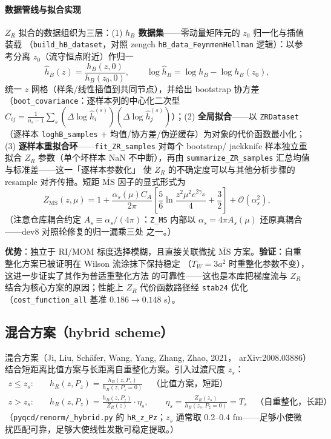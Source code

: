 \documentclass[11pt,a4paper]{ctexart}
\newcommand{\MSbarM}{\overline{\text{MS}}}
\newcommand{\order}[1]{\mathcal{O}(#1)}
\newcommand{\code}[1]{\texttt{#1}}
\begin{document}
\paragraph{数据管线与拟合实现}$Z_R$ 拟合的数据组织为三层：(1)
\textbf{$h_B$ 数据集}——零动量矩阵元的 $z_0$ 归一化与插值装载
（\code{build\_hB\_dataset}，对照 zengch \code{hB\_data\_FeynmenHellman}
逻辑）：以参考分离 $z_0$（流守恒点附近）作归一
\begin{equation}
\widehat h_B(z) = \frac{h_B(z,0)}{h_B(z_0,0)},
\qquad
\log \widehat h_B = \log h_B - \log h_B(z_0),
\end{equation}
统一 $z$ 网格（样条/线性插值到共同节点），并给出 bootstrap 协方差
（\code{boot\_covariance}：逐样本列的中心化二次型
$C_{ij}=\frac{1}{n_s-1}\sum_s(\Delta\log\widehat h_i^{(s)})
(\Delta\log\widehat h_j^{(s)})$）；(2)
\textbf{全局拟合}——以 \code{ZRDataset}（逐样本 \code{loghB\_samples}
+ 均值/协方差/伪逆缓存）为对象的代价函数最小化；(3)
\textbf{逐样本重拟合环}——\code{fit\_ZR\_samples} 对每个 bootstrap/
jackknife 样本独立重拟合 $Z_R$ 参数（单个坏样本 NaN 不中断），再由
\code{summarize\_ZR\_samples} 汇总均值与标准差——这一「逐样本参数化」
使 $Z_R$ 的不确定度可以与其他分析步骤的 resample 对齐传播。短距
$\MSbarM$ 因子的显式形式为
\begin{equation}\label{eq:z-ms}
Z_{\mathrm{MS}}(z,\mu) = 1 + \frac{\alpha_s(\mu)C_A}{2\pi}
\left[\frac{5}{6}\ln\!\frac{z^2\mu^2 e^{2\gamma_E}}{4} + \frac{3}{2}
\right] + \order{\alpha_s^2},
\end{equation}
（注意仓库耦合约定 $A_s\equiv\alpha_s/(4\pi)$：\code{Z\_MS} 内部以
$\alpha_s=4\pi A_s(\mu)$ 还原真耦合——dev8 对照轮修复的归一漏乘三处
之一。）

\textbf{优势}：独立于 RI/MOM 标度选择模糊，且直接关联微扰 $\MSbarM$
方案。\textbf{验证}：自重整化方案已被证明在 Wilson 流涂抹下保持稳定
（$T_W=3a^2$ 时重整化参数不变），这进一步证实了其作为普适重整化方法
的可靠性——这也是本库把梯度流与 $Z_R$ 结合为核心方案的原因；性能上
$Z_R$ 代价函数路径经 \code{stab24} 优化（\code{cost\_function\_all}
基准 $0.186\to0.148$ s）。

\subsection{混合方案（hybrid scheme）}

混合方案（Ji, Liu, Sch\"afer, Wang, Yang, Zhang, Zhao, 2021，
arXiv:2008.03886）结合短距离比值方案与长距离自重整化方案。引入过渡尺度
$z_s$：
\begin{align}
z \le z_s:\quad & h_R(z,P_z) = \frac{h_B(z,P_z)}{h_B(z,P_z=0)}
\quad\text{（比值方案，短距）} \label{eq:hybrid-short}\\
z > z_s:\quad & h_R(z,P_z) = \frac{h_B(z,P_z)}{Z_R(z)}\cdot\eta_s,
\qquad \eta_s = \frac{Z_R(z_s)}{h_B(z_s,P_z=0)} = T_s
\quad\text{（自重整化，长距）} \label{eq:hybrid-long}
\end{align}
（\code{pyqcd/renorm/\_hybrid.py} 的 \code{hR\_z\_Pz}；$z_s$ 通常取
0.2--0.4 fm——足够小使微扰匹配可靠，足够大使线性发散可稳定提取。）
\end{document}
